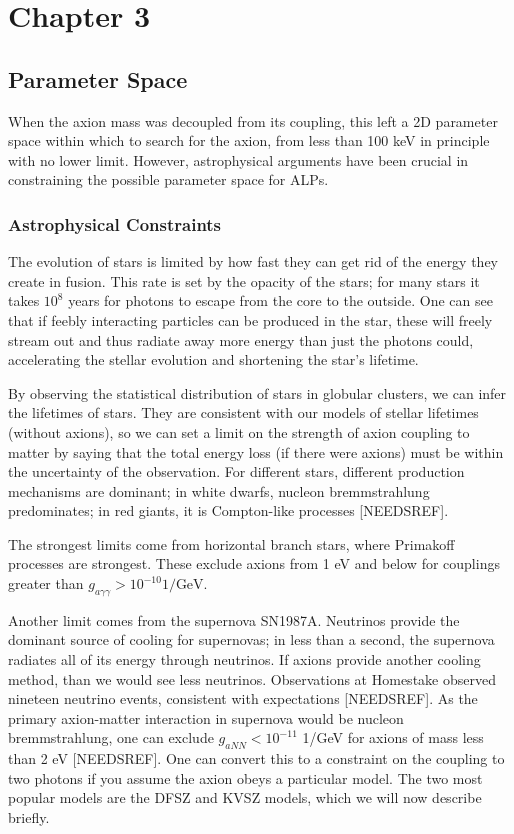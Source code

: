 \documentclass[11pt]{book}
\begin{document}
\chapter{Chapter 3}
\section{Parameter Space}

When the axion mass was decoupled from its coupling, this left a 2D parameter space within which to search for the axion, from less than 100 keV in principle with no lower limit. However, astrophysical arguments have been crucial in constraining the possible parameter space for ALPs.

\subsection{Astrophysical Constraints}

The evolution of stars is limited by how fast they can get rid of the energy they create in fusion. This rate is set by the opacity of the stars; for many stars it takes $10^8$ years for photons to escape from the core to the outside. One can see that if feebly interacting particles can be produced in the star, these will freely stream out and thus radiate away more energy than just the photons could, accelerating the stellar evolution and shortening the star's lifetime.

By observing the statistical distribution of stars in globular clusters, we can infer the lifetimes of stars. They are consistent with our models of stellar lifetimes (without axions), so we can set a limit on the strength of axion coupling to matter by saying that the total energy loss (if there were axions) must be within the uncertainty of the observation. For different stars, different production mechanisms are dominant; in white dwarfs, nucleon bremmstrahlung predominates; in red giants, it is Compton-like processes [NEEDSREF].

The strongest limits come from horizontal branch stars, where Primakoff processes are strongest. These exclude axions from 1 eV and below for couplings greater than $g_{a\gamma\gamma} > 10^{-10} \text{1}/\text{GeV}$.

Another limit comes from the supernova SN1987A. Neutrinos provide the dominant source of cooling for supernovas; in less than a second, the supernova radiates all of its energy through neutrinos. If axions provide another cooling method, than we would see less neutrinos. Observations at Homestake observed nineteen neutrino events, consistent with expectations [NEEDSREF]. As the primary axion-matter interaction in supernova would be nucleon bremmstrahlung, one can exclude $g_{aNN} < 10^{-11}$ 1/GeV for axions of mass less than 2 eV [NEEDSREF]. One can convert this to a constraint on the coupling to two photons if you assume the axion obeys a particular model. The two most popular models are the DFSZ and KVSZ models, which we will now describe briefly.
\end{document}
